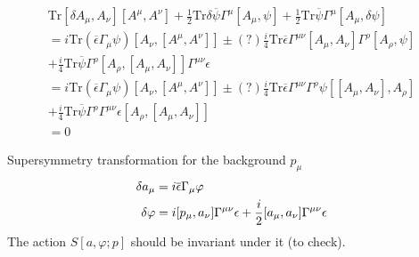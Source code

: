 \begin{align*}
	\mathrm{Tr}[\delta A_\mu,A_\nu][A^\mu,A^\nu]
	+ \frac{1}{2} \mathrm{Tr} \delta \overline{\psi} \Gamma^\mu [A_\mu,\psi]
	+\frac{1}{2} \mathrm{Tr}  \overline{\psi} \Gamma^\mu [A_\mu,\delta\psi]
	\\
	= i \mathrm{Tr} (\overline{\epsilon} \Gamma_\mu \psi)
	[A_\nu,[A^\mu,A^\nu]]
	\pm(?) \frac{i}{4} \mathrm{Tr} \overline{\epsilon}
	\Gamma^{\mu\nu} [A_\mu,A_\nu] \Gamma^\rho [A_\rho,\psi]
	\\
	+ \frac{i}{4} \mathrm{Tr} \overline{\psi}\Gamma^\rho
	[A_\rho,[A_\mu,A_\nu]] \Gamma^{\mu\nu}\epsilon
	\\
	= i \mathrm{Tr} (\overline{\epsilon} \Gamma_\mu \psi)
	[A_\nu,[A^\mu,A^\nu]]
	\pm(?) \frac{i}{4} \mathrm{Tr} \overline{\epsilon}
	\Gamma^{\mu\nu}\Gamma^\rho\psi[ [A_\mu,A_\nu] ,A_\rho]
	\\
	+ \frac{i}{4} \mathrm{Tr} \overline{\psi}\Gamma^\rho \Gamma^{\mu\nu}\epsilon
	[A_\rho,[A_\mu,A_\nu]] 
	\\
	=0
\end{align*}

Supersymmetry transformation for the background $p_\mu$
\begin{align}
	\delta a_\mu &= i \overline{\epsilon} \Gamma_\mu \varphi \notag \\
	\delta \varphi &= i [p_\mu , a_\nu] \Gamma^{\mu\nu}\epsilon
	+ \frac{i}{2} [a_\mu,a_\nu]\Gamma^{\mu\nu}\epsilon
\end{align}
The action $S[a,\varphi;p]$ should be invariant under it (to check).
